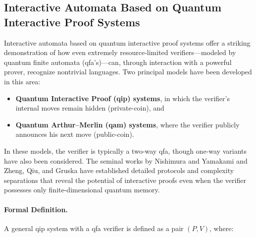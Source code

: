 \subsection{Interactive Automata Based on Quantum Interactive Proof Systems}
\label{sec:interactive-automata}

Interactive automata based on quantum interactive proof systems offer a striking demonstration of how even extremely resource‐limited verifiers—modeled by quantum finite automata (qfa’s)—can, through interaction with a powerful prover, recognize nontrivial languages. Two principal models have been developed in this area:
  
\begin{itemize}
  \item \textbf{Quantum Interactive Proof (\gls{qip}) systems}, in which the verifier’s internal moves remain hidden (private-coin), and
  \item \textbf{Quantum Arthur–Merlin (\gls{qam}) systems}, where the verifier publicly announces his next move (public-coin).
\end{itemize}

In these models, the verifier is typically a two-way qfa, though one-way variants have also been considered. The seminal works by Nishimura and Yamakami \cite{NISHIMURA2009255, nishimura2015interactive} and Zheng, Qiu, and Gruska \cite{ZHENG2015197} have established detailed protocols and complexity separations that reveal the potential of interactive proofs even when the verifier possesses only finite-dimensional quantum memory.

\paragraph{Formal Definition.}
A general \gls{qip} system with a qfa verifier is defined as a pair $(P,V)$, where:

